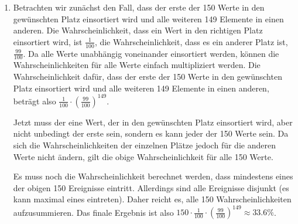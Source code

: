 \documentclass[11pt,a4paper]{article}
\begin{document}
\begin{loesung}
    \begin{enumerate}
        \item Betrachten wir zunächst den Fall, dass der erste der 150 Werte in den gewünschten Platz einsortiert wird und alle weiteren 149 Elemente in einen anderen.
        Die Wahrscheinlichkeit, dass ein Wert in den richtigen Platz einsortiert wird, ist $\frac{1}{100}$, die Wahrscheinlichkeit, dass es ein anderer Platz ist, $\frac{99}{100}$.
        Da alle Werte unabhängig voneinander einsortiert werden, können die Wahrscheinlichkeiten für alle Werte einfach multipliziert werden.
        Die Wahrscheinlichkeit dafür, dass der erste der 150 Werte in den gewünschten Platz einsortiert wird und alle weiteren 149 Elemente in einen anderen, beträgt also $\frac{1}{100}\cdot \left(\frac{99}{100}\right)^{149}$.

        Jetzt muss der eine Wert, der in den gewünschten Platz einsortiert wird, aber nicht unbedingt der erste sein, sondern es kann jeder der 150 Werte sein.
        Da sich die Wahrscheinlichkeiten der einzelnen Plätze jedoch für die anderen Werte nicht ändern, gilt die obige Wahrscheinlichkeit für alle 150 Werte.

        Es muss noch die Wahrscheinlichkeit berechnet werden, dass mindestens eines der obigen 150 Ereignisse eintritt.
        Allerdings sind alle Ereignisse disjunkt (es kann maximal eines eintreten).
        Daher reicht es, alle 150 Wahrscheinlichkeiten aufzusummieren.
        Das finale Ergebnis ist also $150 \cdot \frac{1}{100}\cdot \left(\frac{99}{100}\right)^{149} \approx 33.6\%$. 


\end{enumerate}
\end{loesung}
\end{document}
